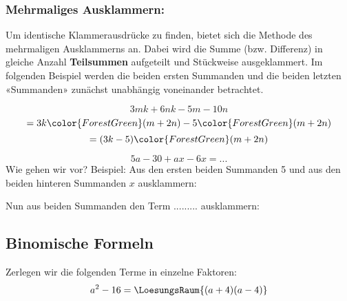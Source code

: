 



\newpage



\subsubsection{Mehrmaliges Ausklammern:}
 Um identische Klammerausdrücke zu finden, bietet sich die Methode des mehrmaligen Ausklammerns an.
 Dabei wird die Summe (bzw. Differenz) in gleiche Anzahl \textbf{Teilsummen} aufgeteilt und Stückweise ausgeklammert.
 Im folgenden Beispiel werden die beiden ersten Summanden und die beiden letzten «Summanden» zunächst unabhängig voneinander betrachtet.

$$3mk+6nk-5m-10n $$
$$= 3k{\color{ForestGreen}(m+2n)}-5{\color{ForestGreen}(m+2n)} $$
$$= (3k-5){\color{ForestGreen}(m+2n)}$$


\begin{beispiel}{}{}
  $$5a-30+ax-6x = ...$$
  Wie gehen wir vor? Beispiel: Aus den ersten beiden Summanden 5 und
  aus den beiden hinteren Summanden $x$ ausklammern:


  Nun aus beiden Summanden den Term ......... 
  ausklammern:

\end{beispiel}



\newpage


\subsection{Binomische Formeln}%



Zerlegen wir die folgenden Terme in einzelne Faktoren:
$$ a^2 - 16 = \LoesungsRaum{(a+4)(a-4)} $$

